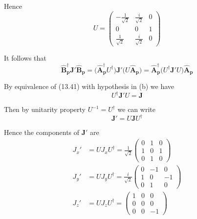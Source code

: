 Hence
\begin{equation*}
U=\begin{pmatrix}
-\frac{1}{\sqrt2}&\frac{i}{\sqrt2}&0
\\
0&0&1
\\
\frac{1}{\sqrt2}&\frac{i}{\sqrt2}&0
\end{pmatrix}
\end{equation*}

It follows that
\begin{equation*}
\hat{\mathbf B}_{\mathbf p}^\dag\mathbf J'\hat{\mathbf B}_{\mathbf p}
=\big(\hat{\mathbf A}_{\mathbf p}^\dag U^\dag\big)\mathbf J'\big(U\hat{\mathbf A}_{\mathbf p}\big)
=\hat{\mathbf A}_{\mathbf p}^\dag\big(U^\dag\mathbf J'U\big)\hat{\mathbf A}_{\mathbf p}
\end{equation*}

By equivalence of (13.41) with hypothesis in (b) we have
\begin{equation*}
U^\dag\mathbf J'U=\mathbf J
\end{equation*}

Then by unitarity property $U^{-1}=U^\dag$ we can write
\begin{equation*}
\mathbf J'=U\mathbf JU^\dag
\end{equation*}

Hence the components of $\mathbf J'$ are
\begin{align*}
J_x'&=UJ_xU^\dag=\frac{1}{\sqrt2}\begin{pmatrix}0&1&0\\1&0&1\\0&1&0\end{pmatrix}
\\
J_y'&=UJ_yU^\dag=\frac{i}{\sqrt2}\begin{pmatrix}0&-1&0\\1&0&-1\\0&1&0\end{pmatrix}
\\
J_z'&=UJ_zU^\dag=\begin{pmatrix}1&0&0\\0&0&0\\0&0&-1\end{pmatrix}
\end{align*}


